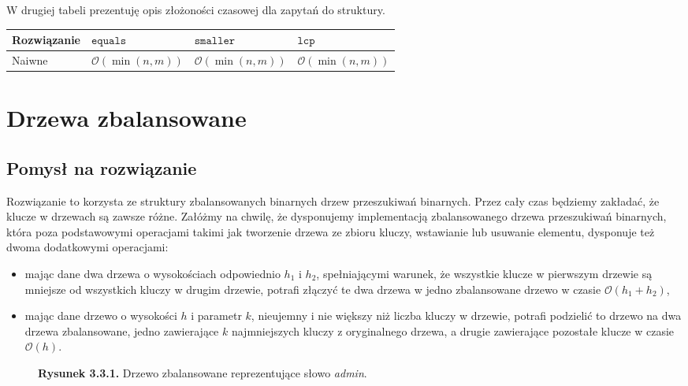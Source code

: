 \documentclass[declaration,shortabstract]{iithesis}
\theoremstyle{definition} \newtheorem{definition}{Definicja}[chapter]
\theoremstyle{remark} \newtheorem{remark}[definition]{Obserwacja}
\theoremstyle{plain} \newtheorem{theorem}[definition]{Twierdzenie}
\theoremstyle{remark} \newtheorem{example}{Przykład}[definition]
\theoremstyle{plain} \newtheorem{lemma}[definition]{Lemat}
\begin{document}
W drugiej tabeli prezentuję opis złożoności czasowej dla zapytań do struktury.

\begin{center}
    \begin{tabular}{ | m{3cm} | >{\centering\arraybackslash}m{3cm} | >{\centering\arraybackslash}m{3cm} | >{\centering\arraybackslash}m{3cm} | }
        \hline 
        Rozwiązanie & $\texttt{equals}$ & $\texttt{smaller}$ & $\texttt{lcp}$ \\
        \hline
        Naiwne & $\mathcal{O}(\min(n, m))$ & $\mathcal{O}(\min(n, m))$ & $\mathcal{O}(\min(n, m))$ \\
        \hline
    \end{tabular}
\end{center}

\section{Drzewa zbalansowane}

\subsection{Pomysł na rozwiązanie}

Rozwiązanie to korzysta ze struktury zbalansowanych binarnych drzew przeszukiwań binarnych. Przez cały czas będziemy zakładać, że klucze w drzewach są zawsze różne. Załóżmy na chwilę, że dysponujemy implementacją zbalansowanego drzewa przeszukiwań binarnych, która poza podstawowymi operacjami takimi jak tworzenie drzewa ze zbioru kluczy, wstawianie lub usuwanie elementu, dysponuje też dwoma dodatkowymi operacjami:
\begin{itemize}
    \item mając dane dwa drzewa o wysokościach odpowiednio $h_1$ i $h_2$, spełniającymi warunek, że wszystkie klucze w pierwszym drzewie są mniejsze od wszystkich kluczy w drugim drzewie, potrafi złączyć te dwa drzewa w jedno zbalansowane drzewo w czasie $\mathcal{O}(h_1 + h_2)$,
    \item mając dane drzewo o wysokości $h$ i parametr $k$, nieujemny i nie większy niż liczba kluczy w drzewie, potrafi podzielić to drzewo na dwa drzewa zbalansowane, jedno zawierające $k$ najmniejszych kluczy z oryginalnego drzewa, a drugie zawierające pozostałe klucze w czasie $\mathcal{O}(h)$.
\end{itemize}

\begin{figure}[h]
    \begin{center}
        \caption*{\textbf{Rysunek 3.3.1.} Drzewo zbalansowane reprezentujące słowo \textit{admin}.}
    \end{center}
\end{figure}
\end{document}
